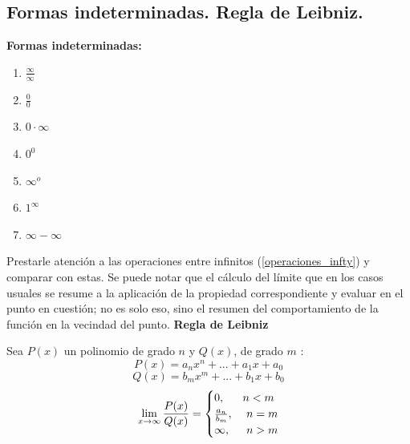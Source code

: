 \documentclass[10pt,twoside]{SelfArx} %
\begin{document}


\subsection{Formas indeterminadas. Regla de Leibniz.}

\textbf{Formas indeterminadas:}\\
 
\begin{enumerate}\label{formasIndeterminadas}
	\item $ \frac{\infty}{\infty} $
	\item $ \frac{0}{0} $
	\item $ 0\cdot \infty $
	\item $ 0^{0} $
	\item $ \infty^{o} $
	\item $ 1^{\infty} $
	\item $ \infty-\infty $
\end{enumerate}
Prestarle atención a las operaciones entre infinitos (\ref{operaciones_infty}) y comparar con estas. Se puede notar que el c\'alculo del límite que en los casos usuales se resume a la aplicación de la propiedad correspondiente y evaluar en el punto en cuestión; no es solo eso, sino el resumen del comportamiento de la función en la vecindad del punto.
\textbf{Regla de Leibniz}\\
\begin{thm}
	Sea $ P(x) $ un polinomio de grado $ n $ y $ Q(x) $, de grado $ m $ :\\
	\[ P(x)=a_{n} x^{n}+...+a_{1} x+a_{0} \]
	\[ Q(x)=b_{m} x^{m}+...+b_{1} x+b_{0} \]
	\[ \lim\limits_{x\rightarrow\infty} \frac{P(x)}{Q(x)}=
	\begin{cases}
	0, & \mbox{$ n<m $} \\
	\frac{a_{n}}{b_{m}}, & \mbox{ $ n=m $}\\
	\infty, & \mbox{ $ n>m $}
	\end{cases}
	\]
		
\end{thm}
\end{document}
